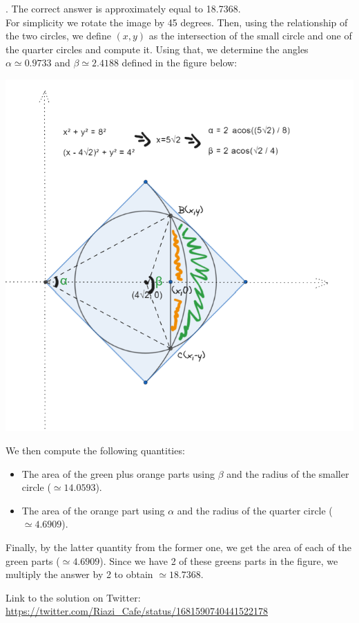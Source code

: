 \begin{solution}.
The correct answer is approximately equal to 18.7368.\\[0.2cm]

For simplicity we rotate the image by 45 degrees. Then, using the relationship of the two circles, we define $(x,y)$ as the intersection of the small circle and one of the quarter circles and compute it. Using that, we determine the angles $\alpha \simeq 0.9733$ and $\beta \simeq 2.4188$ defined in the figure below:

\begin{center}
	\includegraphics[width=14cm]{16/figs/16_geometry2.jpg}
\end{center}

We then compute the following quantities:
\begin{itemize}
\item The area of the green plus orange parts using $\beta$ and the radius of the smaller circle ($\simeq 14.0593$).
\item The area of the orange part using $\alpha$ and the radius of the quarter circle ($\simeq 4.6909$).
\end{itemize}
Finally, by the latter quantity from the former one, we get the area of each of the green parts ($\simeq 4.6909$). Since we have 2 of these greens parts in the figure, we multiply the answer by 2 to obtain $\simeq 18.7368$.


Link to the solution on Twitter:  \url{https://twitter.com/Riazi_Cafe/status/1681590740441522178}\end{solution}